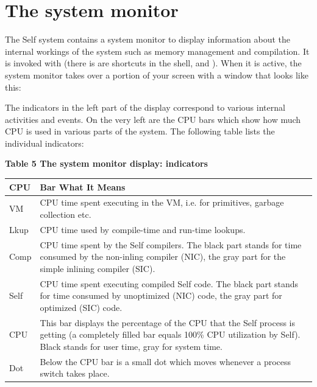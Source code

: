 \documentclass[letterpaper,10pt,english]{sphinxmanual}
\begin{document}
\section{The system monitor}
\label{monitor::doc}\label{monitor:the-system-monitor}
The Self system contains a system monitor to display information about the internal workings of
the system such as memory management and compilation. It is invoked with   (there
is are shortcuts in the shell,  and ). When it is active, the system monitor takes over
a portion of your screen with a window that looks like this:
\begin{figure}[htbp]\begin{flushleft}

\end{flushleft}\end{figure}

The indicators in the left part of the display correspond to various internal activities and events. On
the very left are the CPU bars which show how much CPU is used in various parts of the system.
The following table lists the individual indicators:

\textbf{Table 5 The system monitor display: indicators}

\begin{tabulary}{\linewidth}{p{5cm} p{10cm}}
\hline
\textbf{
CPU
} & \textbf{
Bar What It Means
}\\\hline

VM
 & 
CPU time spent executing in the VM, i.e. for primitives, garbage collection etc.
\\\hline

Lkup
 & 
CPU time used by compile-time and run-time lookups.
\\\hline

Comp
 & 
CPU time spent by the Self compilers. The black part stands for time consumed by the non-inling
compiler (NIC), the gray part for the simple inlining compiler (SIC).
\\\hline

Self
 & 
CPU time spent executing compiled Self code. The black part stands for time consumed by
unoptimized (NIC) code, the gray part for optimized (SIC) code.
\\\hline

CPU
 & 
This bar displays the percentage of the CPU that the Self process is getting (a completely filled
bar equals 100\% CPU utilization by Self). Black stands for user time, gray for system time.
\\\hline

Dot
 & 
Below the CPU bar is a small dot which moves whenever a process switch takes place.
\\\hline
\end{tabulary}
\end{document}
